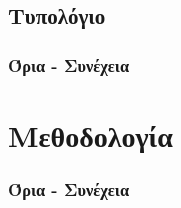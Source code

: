 \documentclass[a4paper,11pt,twoside]{article}
\newcommand{\myleftmark}{\leftmark}
\renewcommand{\myleftmark}{{\large Τυπολόγιο}}
\begin{document}
\newpage
\renewcommand{\myleftmark}{{\large Τυπολόγιο}}
\begin{center}
\part{Τυπολόγιο}
\end{center}
\section{Όρια - Συνέχεια}
\part{Μεθοδολογία}
\section{Όρια - Συνέχεια}
\end{document}
